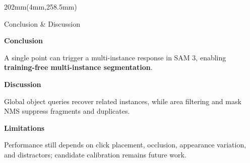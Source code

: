 \documentclass[11pt,a4paper]{article}
\newcommand{\subhead}[1]{%
  {\sffamily\fontsize{11.8}{12.4}\selectfont\bfseries #1}%
}
\begin{document}
\begin{textblock*}{202mm}(4mm,258.5mm)

\begin{sectionbox}[height=34mm]{Conclusion \& Discussion}

\noindent
\begin{minipage}[t]{.32\linewidth}
\subhead{Conclusion}\par
\vspace{.1mm}
{\fontsize{10.2}{10.8}\selectfont
A single point can trigger a multi-instance response in SAM 3, enabling
\textbf{training-free multi-instance segmentation}.
}
\end{minipage}%
\hfill%
\begin{minipage}[t]{.32\linewidth}
\subhead{Discussion}\par
\vspace{.1mm}
{\fontsize{10.2}{10.8}\selectfont
Global object queries recover related instances, while area filtering and
mask NMS suppress fragments and duplicates.
}
\end{minipage}%
\hfill%
\begin{minipage}[t]{.32\linewidth}
\subhead{Limitations}\par
\vspace{.1mm}
{\fontsize{10.2}{10.8}\selectfont
Performance still depends on click placement, occlusion, appearance variation,
and distractors; candidate calibration remains future work.
}
\end{minipage}

\end{sectionbox}

\end{textblock*}

\null
\end{document}

